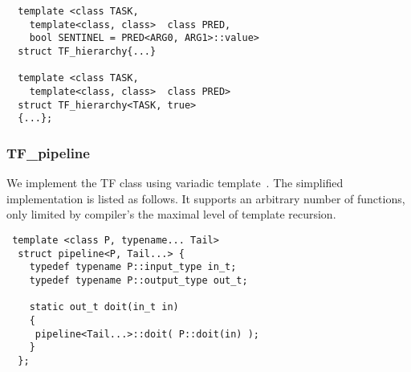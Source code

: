 \begin{lstlisting}
  template <class TASK,
    template<class, class>  class PRED,
    bool SENTINEL = PRED<ARG0, ARG1>::value>
  struct TF_hierarchy{...}

  template <class TASK,
    template<class, class>  class PRED>
  struct TF_hierarchy<TASK, true>
  {...};
\end{lstlisting}

\subsubsection{TF\_pipeline}
We implement the TF class using variadic template~\cite{vartemp}. The
simplified implementation is listed as follows. It supports an arbitrary
number of functions, only limited by compiler's the maximal level of template
recursion.  


\begin{lstlisting}
 template <class P, typename... Tail>
  struct pipeline<P, Tail...> {
    typedef typename P::input_type in_t;
    typedef typename P::output_type out_t;
   
    static out_t doit(in_t in)
    {
     pipeline<Tail...>::doit( P::doit(in) );
    }
  };  
\end{lstlisting}

